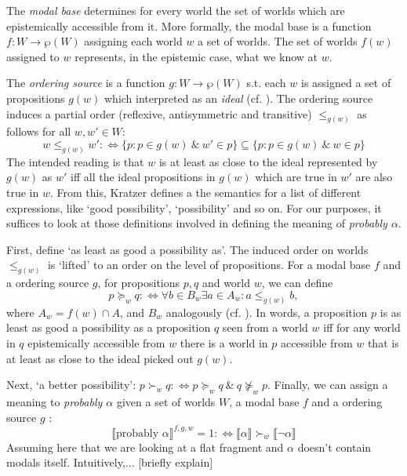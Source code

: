 \documentclass{article}
\theoremstyle{definition}
\newcommand{\lb}{\llbracket}
\newcommand{\rb}{\rrbracket}
\begin{document}
The \emph{modal base} determines for every world the set of worlds which are epistemically accessible from it.
More formally, the modal base is a function $f: W \rightarrow \wp(W)$ assigning each world $w$ a set of worlds.
The set of worlds $f(w)$ assigned to $w$ represents, in the epistemic case, what we know at $w$.

The \emph{ordering source} is a function $g: W \rightarrow \wp(W)$ s.t. each $w$ is assigned a set of propositions $g(w)$ which interpreted as an \emph{ideal} (cf. \cite{lewis81_order_seman_premis_seman_count}). The ordering source induces a partial order (reflexive, antisymmetric and transitive) $\leq_{g(w)}$ as follows for all $w,w' \in W$: 
\begin{equation}
    \label{eq:porder}
w \leq_{g(w)} w' :\iff \{p: p\in g(w) ~\&~ w' \in p\} \subseteq \{p: p\in  g(w) ~\&~ w \in p\}
\end{equation}
The intended reading is that $w$ is at least as close to the ideal represented by $g(w)$ as $w'$ iff all the ideal propositions in $g(w)$ which are true in $w'$ are also true in $w$.
From this, Kratzer defines a the semantics for a list of different expressions, like `good possibility', `possibility' and so on.
For our purposes, it suffices to look at those definitions involved in defining the meaning of \emph{probably $\alpha$}.

First, define `as least as good a possibility as'.
The induced order on worlds $\leq_{g(w)}$ is `lifted' to an order on the level of propositions.
For a modal base $f$ and a ordering source $g$, for propositions $p,q$ and world $w$, we can define
\begin{equation}
    \label{eq:lifted}
    p \succeq_w q :\iff \forall b \in B_w \exists a \in A_w: a \leq_{g(w)} b,
\end{equation}
where $A_w = f(w) \cap A$, and $B_w$ analogously (cf. \cite[][p.~519]{holliday13_measur}).
In words, a proposition $p$ is as least as good a possibility as a proposition $q$ seen from a world $w$ iff for any world in $q$ epistemically accessible from $w$ there is a world in $p$ accessible from $w$ that is at least as close to the ideal picked out $g(w)$.

Next, `a better possibility': $p \succ_w q :\iff p \succeq_w q ~\&~ q \not\succeq_w p$.  
Finally, we can assign a meaning to \emph{probably $\alpha$} given a set of worlds $W$, a modal base $f$ and a ordering source $g$ \parencite[][p.~645]{kratzer91_modal}:
\begin{equation}
\llbracket \text{probably } \alpha \rrbracket^{f,g,w} = 1 :\iff \lb \alpha \rb \succ_w \lb \neg\alpha \rb
\end{equation}
Assuming here that we are looking at a flat fragment and $\alpha$ doesn't contain modals itself.
Intuitively,... [briefly explain]
\end{document}
